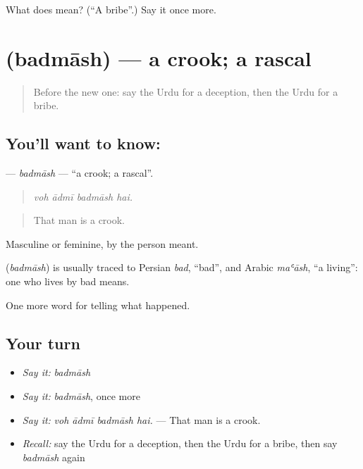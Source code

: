 \begin{tcolorbox}[breakable,colback=teal!4,colframe=teal!35!black,title={Before you move on}]
What does  mean? (\textquotedblleft{}A bribe\textquotedblright{}.) Say it once more.
\end{tcolorbox}
\section[\texorpdfstring{\ur{بدمعاش} (badmāsh)}{بدمعاش (badmāsh)}]{ (badmāsh) — a crook; a rascal}

\label{lesson:UR-C281-badmash}



\begin{quote}
Before the new one: say the Urdu for a deception, then the Urdu for a bribe.
\end{quote}

\subsection*{You'll want to know: }
\textbf{} — \emph{badmāsh} — \textquotedblleft{}a crook; a rascal\textquotedblright{}.

\begin{quote}
   
\end{quote}

\begin{quote}
\emph{voh ādmī badmāsh hai.}
\end{quote}

\begin{quote}
That man is a crook.
\end{quote}

Masculine or feminine, by the person meant.

\begin{cousinweb}
\textbf{} (\emph{badmāsh}) is usually traced to Persian \emph{bad}, \textquotedblleft{}bad\textquotedblright{}, and Arabic \emph{maʿāsh}, \textquotedblleft{}a living\textquotedblright{}: one who lives by bad means.
\end{cousinweb}

\begin{grammarlens}[title={What you've built}]
One more word for telling what happened.
\end{grammarlens}

\subsection*{Your turn}
\begin{itemize}
\raggedright
  \item \emph{Say it:} \emph{badmāsh}
  \item \emph{Say it:} \emph{badmāsh}, once more
  \item \emph{Say it:} \emph{voh ādmī badmāsh hai.} — That man is a crook.
  \item \emph{Recall:} say the Urdu for a deception, then the Urdu for a bribe, then say \emph{badmāsh} again
\end{itemize}

